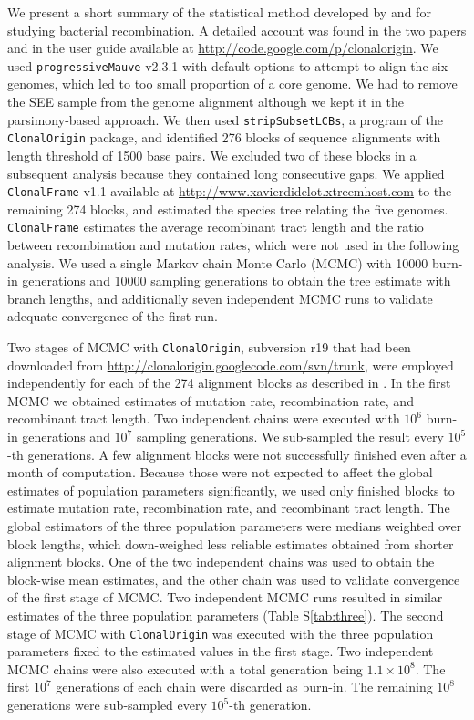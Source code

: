 \documentclass[english]{article}
\begin{document}
We present a short summary of the statistical method developed by
\citet{Didelot2007} and \citet{Didelot2010} for studying bacterial
recombination. A detailed account was found in the two papers and in the user
guide available at \url{http://code.google.com/p/clonalorigin}.  We used
\texttt{progressiveMauve} v2.3.1 \citep{Darling2004,Darling2010} with default
options to attempt to align the six genomes, which led to too small proportion
of a core genome. We had to remove the SEE sample from the genome alignment
although we kept it in the parsimony-based approach.  We then used
\texttt{stripSubsetLCBs}, a program of the \texttt{ClonalOrigin} package, and
identified 276 blocks of sequence alignments with length threshold of 1500 base
pairs.  We excluded two of these blocks in a subsequent analysis because they
contained long consecutive gaps.  We applied \texttt{ClonalFrame} v1.1 available
at \url{http://www.xavierdidelot.xtreemhost.com} to the remaining 274 blocks,
and estimated the species tree relating the five genomes. \texttt{ClonalFrame}
estimates the average recombinant tract length and the ratio between
recombination and mutation rates, which were not used in the following analysis.
We used a single Markov chain Monte Carlo (MCMC) with 10000 burn-in generations
and 10000 sampling generations to obtain the tree estimate with branch lengths,
and additionally seven independent MCMC runs to validate adequate convergence of
the first run.

Two stages of MCMC with \texttt{ClonalOrigin}, subversion r19 that had been
downloaded from \url{http://clonalorigin.googlecode.com/svn/trunk}, were
employed independently for each of the 274 alignment blocks as described in
\citet{Didelot2010}.   In the first MCMC we obtained estimates of mutation rate,
recombination rate, and recombinant tract length.  Two independent chains were
executed with $10^6$ burn-in generations and $10^7$ sampling generations. We
sub-sampled the result every $10^5$-th generations.  A few alignment blocks were
not successfully finished even after a month of computation.  Because those were
not expected to affect the global estimates of population parameters
significantly, we used only finished blocks to estimate mutation rate,
recombination rate, and recombinant tract length.  The global estimators of the
three population parameters were medians weighted over block lengths, which
down-weighed less reliable estimates obtained from shorter alignment blocks.
One of the two independent chains was used to obtain the block-wise mean
estimates, and the other chain was used to validate convergence of the first
stage of MCMC.  Two independent MCMC runs resulted in similar estimates of the
three population parameters (Table S\ref{tab:three}).  The second stage of MCMC
with \texttt{ClonalOrigin} was executed with the three population parameters
fixed to the estimated values in the first stage.  Two independent MCMC chains
were also executed with a total generation being $1.1\times10^8$. The first
$10^7$ generations of each chain were discarded as burn-in. The remaining $10^8$
generations were sub-sampled every $10^5$-th generation.  
\end{document}
